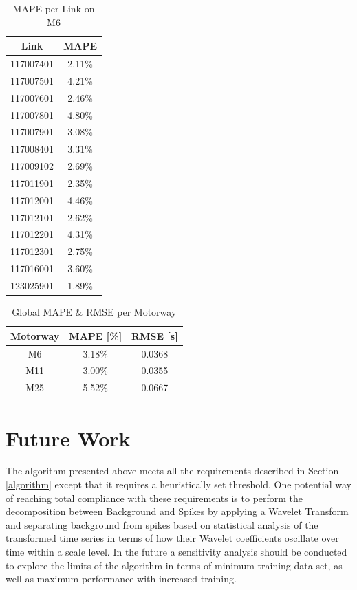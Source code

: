 \documentclass[conference, letterpaper]{IEEEtran}
\begin{document}
\begin{table}[htbp]
	\caption{MAPE per Link on M6}
	\begin{center}
		\begin{tabular}{|c|c|}
			\hline
			\textbf{Link}&{\textbf{MAPE}} \\
			\hline
			117007401& 2.11\%\\
			\hline
			117007501& 4.21\%\\
			\hline
			117007601& 2.46\%\\
			\hline
			117007801& 4.80\%\\
			\hline
			117007901& 3.08\%\\
			\hline
			117008401& 3.31\%\\
			\hline
			117009102& 2.69\%\\
			\hline
			117011901& 2.35\%\\
			\hline
			117012001& 4.46\%\\
			\hline
			117012101& 2.62\%\\
			\hline
			117012201& 4.31\%\\
			\hline
			117012301& 2.75\%\\
			\hline
			117016001& 3.60\%\\
			\hline
			123025901& 1.89\%\\
			\hline
		\end{tabular}
		\label{tab1}
	\end{center}
	\label{table:m6mape}
\end{table}

\begin{table}[htbp]
	\caption{Global MAPE \& RMSE per Motorway}
	\begin{center}
		\begin{tabular}{|c|c|c|}
			\hline
			\textbf{Motorway}&{\textbf{MAPE [\%]}}&{\textbf{RMSE [s]}} \\
			\hline
			M6& 3.18\%& 0.0368\\
			\hline
			M11& 3.00\%& 0.0355\\
			\hline
			M25& 5.52\%& 0.0667\\
			\hline
		\end{tabular}
		\label{mapeglobal}
	\end{center}
\end{table}

\section{Future Work}
The algorithm presented above meets all the requirements described in Section \ref{algorithm} except that it requires a heuristically set threshold. 
One potential way of reaching total compliance with these requirements is to perform the decomposition between Background and Spikes by applying a Wavelet Transform and separating background from spikes based on statistical analysis of the transformed time series in terms of how their Wavelet coefficients oscillate over time within a scale level. 
In the future a sensitivity analysis should be conducted to explore the limits of the algorithm in terms of minimum training data set, as well as maximum performance with increased training.
\end{document}
